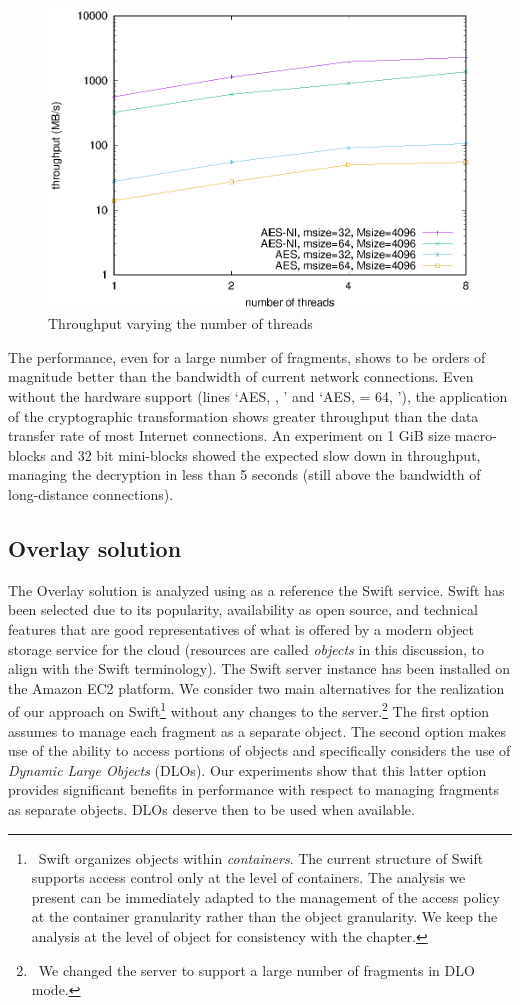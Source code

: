 \begin{figure}
	\centering
	\includegraphics[width=0.8\columnwidth,valign=t]{figures/fig09}
	\caption{\label{ms:fig:clientPerf}Throughput varying the number of threads}
\end{figure}

The performance, even for a large number of fragments, shows to be orders of magnitude better than the bandwidth of current network connections. Even without the hardware support (lines `AES, , ' and `AES, \msize= 64, '), the application of the cryptographic transformation shows greater throughput than the data transfer rate of most Internet connections. An experiment on 1 GiB size macro-blocks and 32 bit mini-blocks showed the expected slow down in throughput, managing the decryption in less than 5 seconds (still above the bandwidth of long-distance connections).


\subsection{Overlay solution \label{ms:sec:overlay}}
The Overlay solution is analyzed using as a reference the Swift service. Swift has been selected due to its popularity, availability as open source, and technical features that are good representatives of what is offered by a modern object storage service for the cloud (resources are called {\em objects} in this discussion, to align with the Swift terminology). The Swift server instance has been installed on the Amazon EC2 platform. We consider two main alternatives for the realization of our approach on Swift\footnote{\ Swift organizes objects within {\em containers}. The current structure of Swift supports access control only at the level of containers. The analysis we present can be immediately adapted to the management of the access policy at the container granularity rather than the object granularity. We keep the analysis at the level of object for consistency with the chapter.} without any changes to the server.\footnote{\ We changed the server to support a large number of fragments in DLO mode.} The first option assumes to manage each fragment as a separate object. The second option makes use of the ability to access portions of objects and specifically considers the use of {\em Dynamic Large Objects} (DLOs). Our experiments show that this latter option provides significant benefits in performance with respect to managing fragments as separate objects. DLOs deserve then to be used when available.

